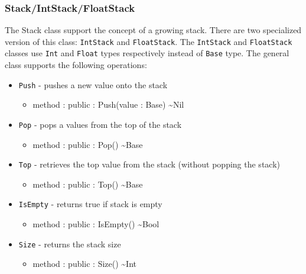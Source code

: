 \documentclass[11pt]{article}
\begin{document}
\subsubsection{Stack/IntStack/FloatStack}
The Stack class support the concept of a growing stack.  There are two
specialized version of this class: \texttt{IntStack} and
\texttt{FloatStack}.  The \texttt{IntStack} and \texttt{FloatStack}
classes use \texttt{Int} and \texttt{Float} types respectively instead
of \texttt{Base} type.  The general class supports the following
operations:
\begin{itemize}
\item \texttt{Push} - pushes a new value onto the stack
  \begin{itemize}
  \item method : public : Push(value : Base) \textasciitilde Nil
  \end{itemize}
\item \texttt{Pop} - pops a values from the top of the stack
  \begin{itemize}
  \item method : public : Pop() \textasciitilde Base
  \end{itemize}
\item \texttt{Top} - retrieves the top value from the stack (without
  popping the stack)
  \begin{itemize}
  \item method : public : Top() \textasciitilde Base
  \end{itemize}
\item \texttt{IsEmpty} - returns true if stack is empty
  \begin{itemize}
  \item method : public : IsEmpty() \textasciitilde Bool
  \end{itemize}
\item \texttt{Size} - returns the stack size
  \begin{itemize}
  \item method : public : Size() \textasciitilde Int
  \end{itemize}
\end{itemize}
\end{document}
